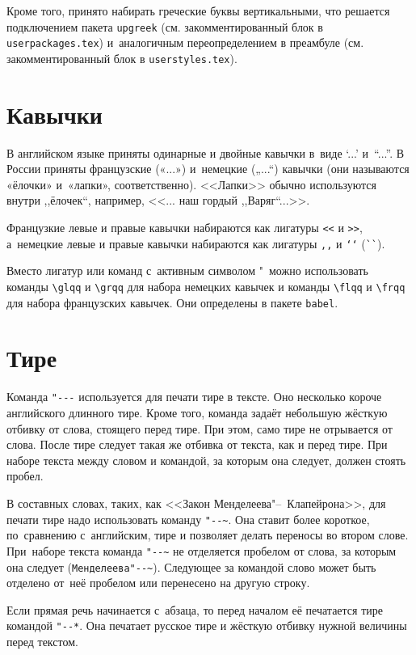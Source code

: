 Кроме того, принято набирать греческие буквы вертикальными, что решается подключением пакета \verb|upgreek| (см. закомментированный блок в \verb|userpackages.tex|) и~аналогичным переопределением в преамбуле (см. закомментированный блок в \verb|userstyles.tex|).


\section{Кавычки}
В английском языке приняты одинарные и двойные кавычки в~виде ‘...’ и~“...”. В России приняты французские («...») и~немецкие („...“) кавычки (они называются «ёлочки» и~«лапки», соответственно). <<Лапки>> обычно используются внутри ,,ёлочек``, например, <<... наш гордый ,,Варяг``...>>.

Французкие левые и правые кавычки набираются
как лигатуры \verb|<<| и \verb|>>|, а~немецкие левые и правые кавычки набираются как лигатуры \verb|,,| и \verb|‘‘| (\verb|``|).

Вместо лигатур или команд с~активным символом "\ можно использовать команды \verb|\glqq| и \verb|\grqq| для набора немецких кавычек и команды \verb|\flqq| и \verb|\frqq| для набора французских кавычек. Они определены в пакете \verb|babel|.

\section{Тире}
Команда \verb|"---| используется для печати тире в тексте. Оно несколько короче английского длинного тире. Кроме того, команда задаёт небольшую жёсткую отбивку от слова, стоящего перед тире. При этом, само тире не отрывается от слова. После тире следует такая же отбивка от текста, как и перед тире. При наборе текста между словом и командой, за которым она следует, должен стоять пробел.

В составных словах, таких, как <<Закон Менделеева"--~Клапейрона>>, для печати тире надо использовать команду \verb|"--~|. Она ставит более короткое, по~сравнению с~английским, тире и позволяет делать переносы во втором слове. При~наборе текста команда \verb|"--~| не отделяется пробелом от слова, за которым она следует (\verb|Менделеева"--~|). Следующее за командой слово может быть  отделено от~неё пробелом или перенесено на другую строку.

Если прямая речь начинается с~абзаца, то перед началом её печатается тире командой
\verb|"--*|. Она печатает русское тире и жёсткую отбивку нужной величины перед текстом.

